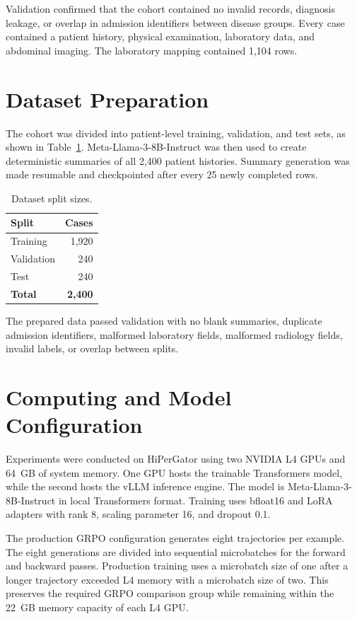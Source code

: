 \documentclass[11pt]{article}
\begin{document}
Validation confirmed that the cohort contained no invalid records, diagnosis
leakage, or overlap in admission identifiers between disease groups. Every
case contained a patient history, physical examination, laboratory data, and
abdominal imaging. The laboratory mapping contained 1,104 rows.

\section{Dataset Preparation}

The cohort was divided into patient-level training, validation, and test sets,
as shown in Table~\ref{tab:splits}. Meta-Llama-3-8B-Instruct was then used to
create deterministic summaries of all 2,400 patient histories. Summary
generation was made resumable and checkpointed after every 25 newly completed
rows.

\begin{table}[ht]
    \centering
    \caption{Dataset split sizes.}
    \label{tab:splits}
    \begin{tabular}{lr}
        \toprule
        Split & Cases \\
        \midrule
        Training & 1,920 \\
        Validation & 240 \\
        Test & 240 \\
        \midrule
        \textbf{Total} & \textbf{2,400} \\
        \bottomrule
    \end{tabular}
\end{table}

The prepared data passed validation with no blank summaries, duplicate
admission identifiers, malformed laboratory fields, malformed radiology
fields, invalid labels, or overlap between splits.

\section{Computing and Model Configuration}

Experiments were conducted on HiPerGator using two NVIDIA L4 GPUs and 64~GB of
system memory. One GPU hosts the trainable Transformers model, while the second
hosts the vLLM inference engine. The model is Meta-Llama-3-8B-Instruct in local
Transformers format. Training uses bfloat16 and LoRA adapters with rank 8,
scaling parameter 16, and dropout 0.1.

The production GRPO configuration generates eight trajectories per example.
The eight generations are divided into sequential microbatches for the forward
and backward passes. Production training uses a microbatch size of one after a
longer trajectory exceeded L4 memory with a microbatch size of two. This preserves the required GRPO comparison
group while remaining within the 22~GB memory capacity of each L4 GPU.
\end{document}
